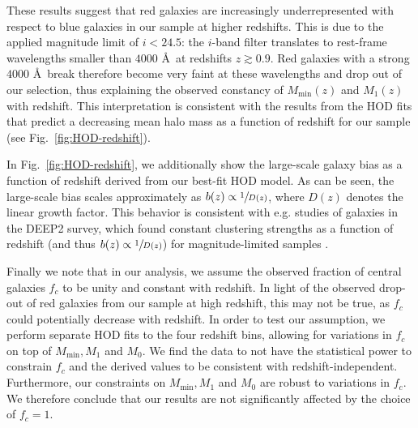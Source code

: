 \documentclass[a4paper,11pt]{article}
\begin{document}
      These results suggest that red galaxies are increasingly underrepresented with respect to blue galaxies in our sample at higher redshifts. This is due to the applied magnitude limit of $i < 24.5$: the $i$-band filter translates to rest-frame wavelengths smaller than $4000$ \AA \, at redshifts $z \gtrsim 0.9$. Red galaxies with a strong $4000$ \AA \, break therefore become very faint at these wavelengths and drop out of our selection, thus explaining the observed constancy of $M_{\mathrm{min}}(z)$ and $M_{1}(z)$ with redshift. This interpretation is consistent with the results from the HOD fits that predict a decreasing mean halo mass as a function of redshift for our sample (see Fig.~\ref{fig:HOD-redshift}).

      In Fig.~\ref{fig:HOD-redshift}, we additionally show the large-scale galaxy bias as a function of redshift derived from our best-fit HOD model. As can be seen, the large-scale bias scales approximately as $b(z) \propto \sfrac{1}{D(z)}$, where $D(z)$ denotes the linear growth factor. This behavior is consistent with e.g. studies of galaxies in the DEEP2 survey, which found constant clustering strengths as a function of redshift (and thus $b(z) \propto \sfrac{1}{D(z)}$) for magnitude-limited samples \cite{Coil:2004}.
      
Finally we note that in our analysis, we assume the observed fraction of central galaxies $f_{c}$ to be unity and constant with redshift. In light of the observed drop-out of red galaxies from our sample at high redshift, this may not be true, as $f_{c}$ could potentially decrease with redshift. In order to test our assumption, we perform separate HOD fits to the four redshift bins, allowing for variations in $f_{c}$ on top of $M_{\mathrm{min}}, M_{1}$ and $M_{0}$. We find the data to not have the statistical power to constrain $f_{c}$ and the derived values to be consistent with redshift-independent. Furthermore, our constraints on $M_{\mathrm{min}}, M_{1}$ and $M_{0}$ are robust to variations in $f_{c}$. We therefore conclude that our results are not significantly affected by the choice of $f_{c}=1$.  
\end{document}
